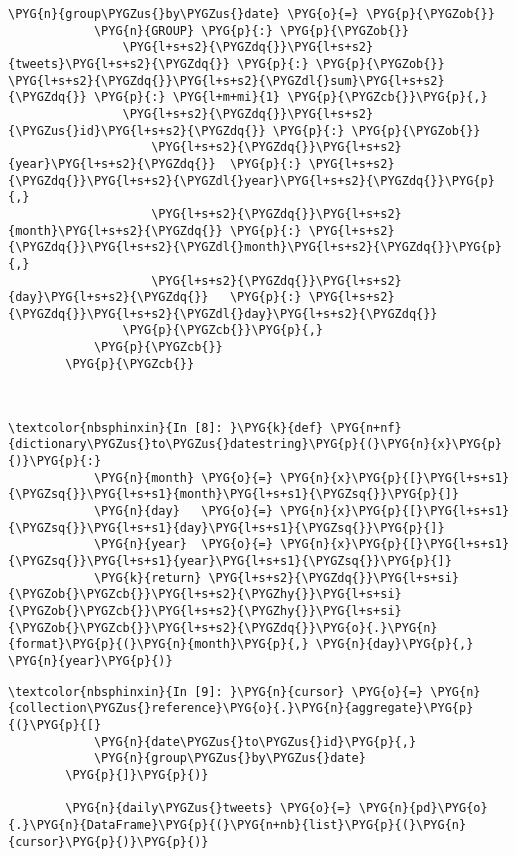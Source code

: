 \documentclass[letterpaper,10pt,english]{sphinxmanual}
\begin{document}
\begin{Verbatim}[commandchars=\\\{\}]
        \PYG{n}{group\PYGZus{}by\PYGZus{}date} \PYG{o}{=} \PYG{p}{\PYGZob{}}
            \PYG{n}{GROUP} \PYG{p}{:} \PYG{p}{\PYGZob{}}
                \PYG{l+s+s2}{\PYGZdq{}}\PYG{l+s+s2}{tweets}\PYG{l+s+s2}{\PYGZdq{}} \PYG{p}{:} \PYG{p}{\PYGZob{}} \PYG{l+s+s2}{\PYGZdq{}}\PYG{l+s+s2}{\PYGZdl{}sum}\PYG{l+s+s2}{\PYGZdq{}} \PYG{p}{:} \PYG{l+m+mi}{1} \PYG{p}{\PYGZcb{}}\PYG{p}{,}
                \PYG{l+s+s2}{\PYGZdq{}}\PYG{l+s+s2}{\PYGZus{}id}\PYG{l+s+s2}{\PYGZdq{}} \PYG{p}{:} \PYG{p}{\PYGZob{}}
                    \PYG{l+s+s2}{\PYGZdq{}}\PYG{l+s+s2}{year}\PYG{l+s+s2}{\PYGZdq{}}  \PYG{p}{:} \PYG{l+s+s2}{\PYGZdq{}}\PYG{l+s+s2}{\PYGZdl{}year}\PYG{l+s+s2}{\PYGZdq{}}\PYG{p}{,}
                    \PYG{l+s+s2}{\PYGZdq{}}\PYG{l+s+s2}{month}\PYG{l+s+s2}{\PYGZdq{}} \PYG{p}{:} \PYG{l+s+s2}{\PYGZdq{}}\PYG{l+s+s2}{\PYGZdl{}month}\PYG{l+s+s2}{\PYGZdq{}}\PYG{p}{,}
                    \PYG{l+s+s2}{\PYGZdq{}}\PYG{l+s+s2}{day}\PYG{l+s+s2}{\PYGZdq{}}   \PYG{p}{:} \PYG{l+s+s2}{\PYGZdq{}}\PYG{l+s+s2}{\PYGZdl{}day}\PYG{l+s+s2}{\PYGZdq{}}
                \PYG{p}{\PYGZcb{}}\PYG{p}{,}
            \PYG{p}{\PYGZcb{}}
        \PYG{p}{\PYGZcb{}}
        
        
\end{Verbatim}

%
\begin{Verbatim}[commandchars=\\\{\}]
\textcolor{nbsphinxin}{In [8]: }\PYG{k}{def} \PYG{n+nf}{dictionary\PYGZus{}to\PYGZus{}datestring}\PYG{p}{(}\PYG{n}{x}\PYG{p}{)}\PYG{p}{:}
            \PYG{n}{month} \PYG{o}{=} \PYG{n}{x}\PYG{p}{[}\PYG{l+s+s1}{\PYGZsq{}}\PYG{l+s+s1}{month}\PYG{l+s+s1}{\PYGZsq{}}\PYG{p}{]}
            \PYG{n}{day}   \PYG{o}{=} \PYG{n}{x}\PYG{p}{[}\PYG{l+s+s1}{\PYGZsq{}}\PYG{l+s+s1}{day}\PYG{l+s+s1}{\PYGZsq{}}\PYG{p}{]}
            \PYG{n}{year}  \PYG{o}{=} \PYG{n}{x}\PYG{p}{[}\PYG{l+s+s1}{\PYGZsq{}}\PYG{l+s+s1}{year}\PYG{l+s+s1}{\PYGZsq{}}\PYG{p}{]}
            \PYG{k}{return} \PYG{l+s+s2}{\PYGZdq{}}\PYG{l+s+si}{\PYGZob{}\PYGZcb{}}\PYG{l+s+s2}{\PYGZhy{}}\PYG{l+s+si}{\PYGZob{}\PYGZcb{}}\PYG{l+s+s2}{\PYGZhy{}}\PYG{l+s+si}{\PYGZob{}\PYGZcb{}}\PYG{l+s+s2}{\PYGZdq{}}\PYG{o}{.}\PYG{n}{format}\PYG{p}{(}\PYG{n}{month}\PYG{p}{,} \PYG{n}{day}\PYG{p}{,} \PYG{n}{year}\PYG{p}{)}
\end{Verbatim}

%
\begin{Verbatim}[commandchars=\\\{\}]
\textcolor{nbsphinxin}{In [9]: }\PYG{n}{cursor} \PYG{o}{=} \PYG{n}{collection\PYGZus{}reference}\PYG{o}{.}\PYG{n}{aggregate}\PYG{p}{(}\PYG{p}{[}
            \PYG{n}{date\PYGZus{}to\PYGZus{}id}\PYG{p}{,}
            \PYG{n}{group\PYGZus{}by\PYGZus{}date}
        \PYG{p}{]}\PYG{p}{)}
        
        \PYG{n}{daily\PYGZus{}tweets} \PYG{o}{=} \PYG{n}{pd}\PYG{o}{.}\PYG{n}{DataFrame}\PYG{p}{(}\PYG{n+nb}{list}\PYG{p}{(}\PYG{n}{cursor}\PYG{p}{)}\PYG{p}{)}
\end{Verbatim}
\end{document}
